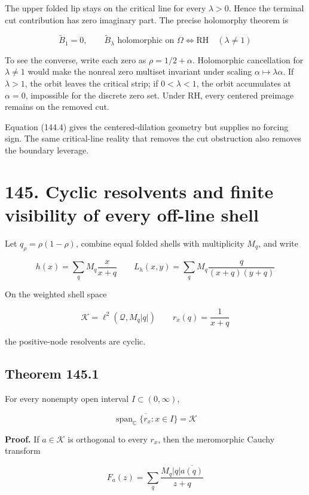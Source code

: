 \documentclass[
  11pt,
]{book}
\begin{document}
The upper folded lip stays on the critical line for every \(\lambda>0\).
Hence the terminal cut contribution has zero imaginary part. The precise
holomorphy theorem is

\[
\boxed{
\widetilde B_1=0,\qquad
\widetilde B_\lambda\text{ holomorphic on }\Omega
\iff\mathrm{RH}\quad(\lambda\ne1)}
\tag{144.4}
\]

To see the converse, write each zero as \(\rho=1/2+\alpha\). Holomorphic
cancellation for \(\lambda\ne1\) would make the nonreal zero multiset
invariant under scaling \(\alpha\mapsto\lambda\alpha\). If
\(\lambda>1\), the orbit leaves the critical strip; if \(0<\lambda<1\),
the orbit accumulates at \(\alpha=0\), impossible for the discrete zero
set. Under RH, every centered preimage remains on the removed cut.

Equation (144.4) gives the centered-dilation geometry but supplies no
forcing sign. The same critical-line reality that removes the cut
obstruction also removes the boundary leverage.

\section{145. Cyclic resolvents and finite visibility of every off-line
shell}\label{cyclic-resolvents-and-finite-visibility-of-every-off-line-shell}

Let \(q_\rho=\rho(1-\rho)\), combine equal folded shells with
multiplicity \(M_q\), and write

\[
h(x)=\sum_qM_q\frac{x}{x+q}
\qquad
L_h(x,y)=\sum_qM_q
\frac{q}{(x+q)(y+q)}
\tag{145.1}
\]

On the weighted shell space

\[
\mathscr K=\ell^2(\mathcal Q,M_q|q|)
\qquad
r_x(q)=\frac1{x+q}
\tag{145.2}
\]

the positive-node resolvents are cyclic.

\subsection{Theorem 145.1}\label{theorem-145.1}

For every nonempty open interval \(I\subset(0,\infty)\),

\[
\boxed{
\overline{\operatorname{span}_{\mathbb C}
\{r_x:x\in I\}}=\mathscr K}
\tag{145.3}
\]

\textbf{Proof.} If \(a\in\mathscr K\) is orthogonal to every \(r_x\),
then the meromorphic Cauchy transform

\[
F_a(z)=\sum_q
\frac{M_q|q|\overline{a(q)}}{z+q}
\tag{145.4}
\]
\end{document}
